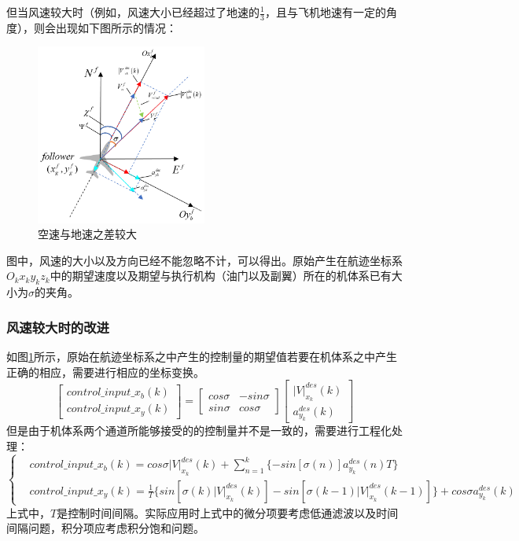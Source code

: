 但当风速较大时（例如，风速大小已经超过了地速的$\frac{1}{3}$，且与飞机地速有一定的角度），则会出现如下图所示的情况：
\begin{figure}[H]
    \centering
    \includegraphics[width=0.5\textwidth]{figures/c3/heavy_wind.png}
    \caption{空速与地速之差较大}\label{fig:heavy_wind}
\end{figure}
图中，风速的大小以及方向已经不能忽略不计，可以得出。原始产生在航迹坐标系$O_kx_ky_kz_k$中的期望速度以及期望与执行机构（油门以及副翼）所在的机体系已有大小为$\sigma$的夹角。
\subsubsection*{风速较大时的改进}
如图\ref{fig:heavy_wind}所示，原始在航迹坐标系之中产生的控制量的期望值若要在机体系之中产生正确的相应，需要进行相应的坐标变换。
\begin{equation}
    \left[
    \begin{matrix}
        control\_input\_x_b(k)\\
        control\_input\_x_y(k)
    \end{matrix}
    \right]
    =  
    \left[  
    \begin{matrix}
        cos\sigma& -sin\sigma\\
        sin\sigma& cos\sigma
    \end{matrix}
    \right]
    \left[
        \begin{matrix}
            |V|_{x_k}^{des}(k)\\
            a_{y_k}^{des}(k)
        \end{matrix}
        \right]
\end{equation}
但是由于机体系两个通道所能够接受的的控制量并不是一致的，需要进行工程化处理：
\begin{equation}
    \left\{
        \begin{aligned}
            &control\_input\_x_b(k)=cos\sigma|V|_{x_k}^{des}(k)+\sum_{n=1}^k\{-sin[\sigma(n)]a_{y_k}^{des}(n)T\}\\
            &control\_input\_x_y(k)=\frac{1}{T}\{sin[\sigma(k)|V|_{x_k}^{des}(k)]-sin[\sigma(k-1)|V|_{x_k}^{des}(k-1)]\}+cos\sigma a_{y_k}^{des}(k)
        \end{aligned}
    \right .
\end{equation}
上式中，$T$是控制时间间隔。实际应用时上式中的微分项要考虑低通滤波以及时间间隔问题，积分项应考虑积分饱和问题。
